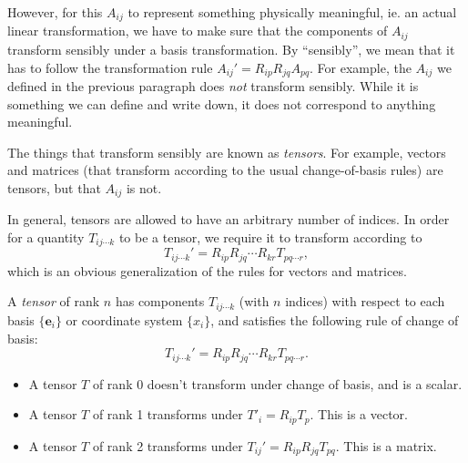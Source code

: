 \documentclass[a4paper]{article}
\begin{document}
However, for this $A_{ij}$ to represent something physically meaningful, ie. an actual linear transformation, we have to make sure that the components of $A_{ij}$ transform sensibly under a basis transformation. By ``sensibly'', we mean that it has to follow the transformation rule $A_{ij}' = R_{ip}R_{jq}A_{pq}$. For example, the $A_{ij}$ we defined in the previous paragraph does \emph{not} transform sensibly. While it is something we can define and write down, it does not correspond to anything meaningful.

The things that transform sensibly are known as \emph{tensors}. For example, vectors and matrices (that transform according to the usual change-of-basis rules) are tensors, but that $A_{ij}$ is not.

In general, tensors are allowed to have an arbitrary number of indices. In order for a quantity $T_{ij\cdots k}$ to be a tensor, we require it to transform according to
\[
  T_{ij\cdots k}' = R_{ip}R_{jq}\cdots R_{kr}T_{pq\cdots r},
\]
which is an obvious generalization of the rules for vectors and matrices.

\begin{defi}[Tensor]
  A \emph{tensor} of rank $n$ has components $T_{ij\cdots k}$ (with $n$ indices) with respect to each basis $\{\mathbf{e}_i\}$ or coordinate system $\{x_i\}$, and satisfies the following rule of change of basis:
  \[
    T_{ij\cdots k}' = R_{ip}R_{jq}\cdots R_{kr}T_{pq\cdots r}.
  \]
\end{defi}

\begin{eg}\leavevmode
  \begin{itemize}
    \item A tensor $T$ of rank 0 doesn't transform under change of basis, and is a scalar.
    \item A tensor $T$ of rank 1 transforms under $T'_i = R_{ip}T_p$. This is a vector.
    \item A tensor $T$ of rank 2 transforms under $T_{ij}' = R_{ip} R_{jq} T_{pq}$. This is a matrix.
  \end{itemize}
\end{eg}
\end{document}
